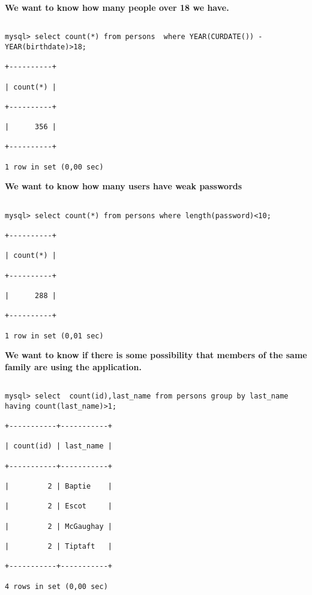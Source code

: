 \documentclass[]{article}
\begin{document}
\textbf{We want to know how many people over 18 we have.}

\begin{verbatim}

mysql> select count(*) from persons  where YEAR(CURDATE()) - YEAR(birthdate)>18;

+----------+

| count(*) |

+----------+

|      356 |

+----------+

1 row in set (0,00 sec)

\end{verbatim}


\textbf{We want to know how many users have weak passwords}

\begin{verbatim}

mysql> select count(*) from persons where length(password)<10;

+----------+

| count(*) |

+----------+

|      288 |

+----------+

1 row in set (0,01 sec)

\end{verbatim}



\textbf{We want to know if there is some possibility that members of the same family are using the application.}

\begin{verbatim}

mysql> select  count(id),last_name from persons group by last_name having count(last_name)>1;

+-----------+-----------+

| count(id) | last_name |

+-----------+-----------+

|         2 | Baptie    |

|         2 | Escot     |

|         2 | McGaughay |

|         2 | Tiptaft   |

+-----------+-----------+

4 rows in set (0,00 sec)

\end{verbatim}
\end{document}
